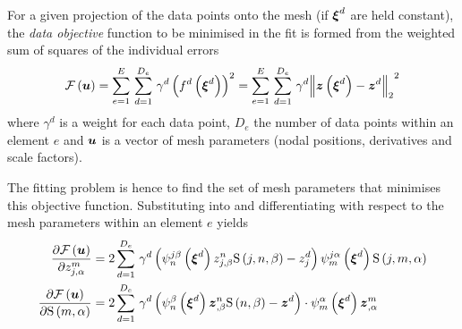 For a given projection of the data points onto the mesh (\ie if
$ \boldsymbol{\xi} ^{d}$ are held constant), the \emph{data objective} function
to be minimised in the fit is formed from the weighted sum of squares of the
individual errors \ie
\begin{equation}
  \fnof{\mathcal{F}}{\vectr{u}}=\gsum{e=1}{E}{\gsum{d=1}{D_{e}}{\gamma^{d}
      \pbrac{\fnof{f^{d}}{\vectr{\xi}^{d}}}^{2}}}=\gsum{e=1}{E}{
    \gsum{d=1}{D_{e}}{\gamma^{d}\norm{\fnof{\vectr{z}}{\vectr{\xi}^{d}}-\vectr{z}^{d}}^{2}}}
  \label{eqn:ldataresidualfn}
\end{equation}
where $\gamma^{d}$ is a weight for each data point, $D_{e}$ the number of
data points within an element $e$ and $ \boldsymbol{u} $ is a vector of mesh
parameters (nodal positions, derivatives and scale factors).

The fitting problem is hence to find the set of mesh parameters that minimises
this objective function. Substituting  into
 and differentiating with respect to the mesh
parameters within an element $e$ yields
\begin{equation}
  \begin{split}
    \delby{\fnof{\mathcal{F}}{\vect{u}}}{z^{m}_{j,\alpha}}&=2
    \gsum{d=1}{D_{e}}{\gamma^{d}
      \pbrac{\idxgbfn{j}{n}{\beta}{\vectr{\xi}^{d}}z^{n}_{j,\beta}\idxgsf{j}{n}{\beta}-z^{d}_{j}}
      \idxgbfn{j}{m}{\alpha}{\vectr{\xi}^{d}}\idxgsf{j}{m}{\alpha}} \\
    \delby{\fnof{\mathcal{F}}{\vect{u}}}{\gsf{m}{\alpha}}&=
      2\gsum{d=1}{D_{e}}{\gamma^{d}\dotprod{\pbrac{\gbfn{n}{\beta}{\vectr{\xi}^{d}}
          \vectr{z}^{n}_{,\beta}\gsf{n}{\beta}-
          \vectr{z}^{d}}}{\gbfn{m}{\alpha}{\vectr{\xi}^{d}}
          \vectr{z}^{m}_{,\alpha}}}
  \end{split}
  \label{eqn:derivldataresidualfn}
\end{equation}

